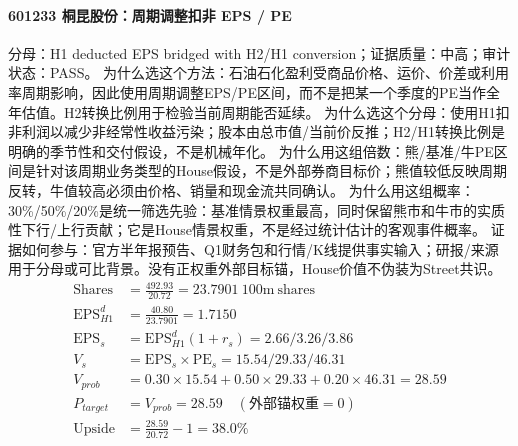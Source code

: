 \paragraph{601233 桐昆股份：周期调整扣非 EPS / PE}
分母：H1 deducted EPS bridged with H2/H1 conversion；证据质量：中高；审计状态：PASS。
为什么选这个方法：石油石化盈利受商品价格、运价、价差或利用率周期影响，因此使用周期调整EPS/PE区间，而不是把某一个季度的PE当作全年估值。H2转换比例用于检验当前周期能否延续。
为什么选这个分母：使用H1扣非利润以减少非经常性收益污染；股本由总市值/当前价反推；H2/H1转换比例是明确的季节性和交付假设，不是机械年化。
为什么用这组倍数：熊/基准/牛PE区间是针对该周期业务类型的House假设，不是外部券商目标价；熊值较低反映周期反转，牛值较高必须由价格、销量和现金流共同确认。
为什么用这组概率：30\%/50\%/20\%是统一筛选先验：基准情景权重最高，同时保留熊市和牛市的实质性下行/上行贡献；它是House情景权重，不是经过统计估计的客观事件概率。
证据如何参与：官方半年报预告、Q1财务包和行情/K线提供事实输入；研报/来源用于分母或可比背景。没有正权重外部目标锚，House价值不伪装为Street共识。
\begin{align*}
\mathrm{Shares} &= \frac{492.93}{20.72}=23.7901\ \mathrm{100m\ shares}\\
\mathrm{EPS}_{H1}^d &= \frac{40.80}{23.7901}=1.7150\\
\mathrm{EPS}_s &= \mathrm{EPS}_{H1}^d(1+r_s)=2.66/3.26/3.86\\
V_s &= \mathrm{EPS}_s\times \mathrm{PE}_s=15.54/29.33/46.31\\
V_{prob} &= 0.30\times 15.54+0.50\times 29.33+0.20\times 46.31=28.59\\
P_{target} &= V_{prob}=28.59\quad(\text{外部锚权重}=0)\\
\mathrm{Upside} &= \frac{28.59}{20.72}-1=38.0\%\\
\end{align*}

